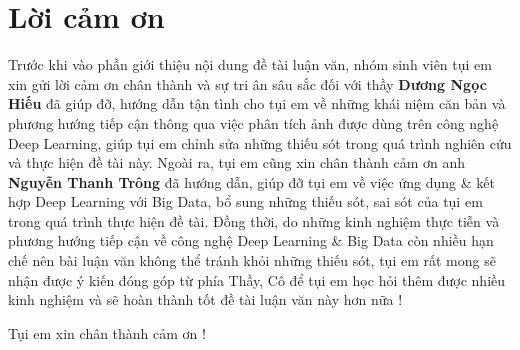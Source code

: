 \documentclass[12pt]{report}
\begin{document}
%
\tableofcontents

%

%
\listoffigures
\listoftables

\chapter*{Lời cảm ơn}


Trước khi vào phần giới thiệu nội dung đề tài luận văn, nhóm sinh viên tụi em xin gửi lời cảm ơn chân thành và sự tri ân sâu sắc đối với thầy \textbf{Dương Ngọc Hiếu} đã giúp đỡ, hướng dẫn tận tình cho tụi em về những khái niệm căn bản và phương hướng tiếp cận thông qua việc phân tích ảnh được dùng trên công nghệ Deep Learning, giúp tụi em chỉnh sửa những thiếu sót trong quá trình nghiên cứu và thực hiện đề tài này. Ngoài ra, tụi em cũng xin chân thành cảm ơn anh \textbf{Nguyễn Thanh Trông} đã hướng dẫn, giúp đỡ tụi em về việc ứng dụng \& kết hợp Deep Learning với Big Data, bổ sung những thiếu sót, sai sót của tụi em trong quá trình thực hiện đề tài. Đồng thời, do những kinh nghiệm thực tiễn và phương hướng tiếp cận về công nghệ Deep Learning \& Big Data còn nhiều hạn chế nên bài luận văn không thể tránh khỏi những thiếu sót, tụi em rất mong sẽ nhận được ý kiến đóng góp từ phía Thầy, Cô để tụi em học hỏi thêm được nhiều kinh nghiệm và sẽ hoàn thành tốt đề tài luận văn này hơn nữa !
\begin{flushright}
Tụi em xin chân thành cảm ơn ! 
\end{flushright}
%
\newpage\cleardoublepage
\newpage\cleardoublepage
\newpage\cleardoublepage
\newpage\cleardoublepage
\newpage\cleardoublepage
\newpage\cleardoublepage
%
\nocite{*}
\newpage\cleardoublepage

\end{document}

